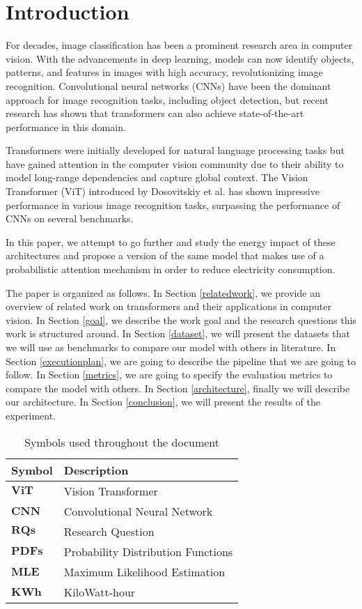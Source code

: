 \section{Introduction}
For decades, image classification has been a prominent research area in computer vision. With the advancements in deep learning, models can now identify objects, patterns, and features in images with high accuracy, revolutionizing image recognition. Convolutional neural networks (CNNs) have been the dominant approach for image recognition tasks, including object detection, but recent research has shown that transformers can also achieve state-of-the-art performance in this domain. 

Transformers were initially developed for natural language processing tasks but have gained attention in the computer vision community due to their ability to model long-range dependencies and capture global context. The Vision Transformer (ViT) introduced by Dosovitskiy et al. \cite{DBLP:journals/corr/abs-2010-11929} has shown impressive performance in various image recognition tasks, surpassing the performance of CNNs on several benchmarks.

In this paper, we attempt to go further and study the energy impact of these architectures and propose a version of the same model that makes use of a probabilistic attention mechanism in order to reduce electricity consumption.

The paper is organized as follows. In Section \ref{relatedwork}, we provide an overview of related work on transformers and their applications in computer vision.  In Section \ref{goal}, we describe the work goal and the research questions this work is structured around. In Section \ref{dataset}, we will present the datasets that we will use as benchmarks to compare our model with others in literature. In Section \ref{executionplan}, we are going to describe the pipeline that we are going to follow. In Section \ref{metrics}, we are going to specify the evaluation metrics to compare the model with others. In Section \ref{architecture}, finally we will describe our architecture. In Section \ref{conclusion}, we will present the results of the experiment.

\begin{table}[h]
\centering
\begin{tabular}{|l|l|}
\hline
\textbf{Symbol} & \textbf{Description}        \\ \hline
$ \textbf{ViT}$              & Vision Transformer \\
$ \textbf{CNN}$              & Convolutional Neural Network \\
$ \textbf{RQs}$              & Research Question \\
$ \textbf{PDFs}$              & Probability Distribution Functions \\
$ \textbf{MLE}$              & Maximum Likelihood Estimation \\
$ \textbf{KWh}$              & KiloWatt-hour \\


\hline
\end{tabular}
\caption{Symbols used throughout the document}
\label{tab:symbols-table}
\end{table}
